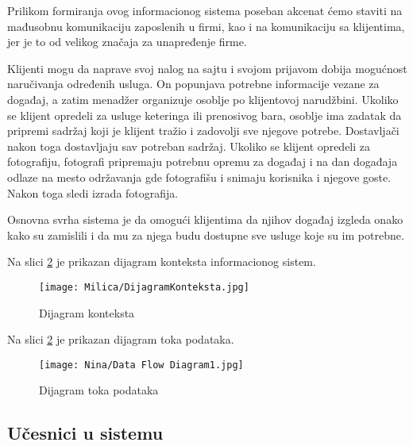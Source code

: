 \documentclass[a4paper]{article}
\begin{document}
Prilikom formiranja ovog informacionog sistema poseban akcenat ćemo staviti na mađusobnu komunikaciju zaposlenih u firmi, kao i na komunikaciju sa klijentima, jer je to od velikog značaja za unapređenje firme.
    
Klijenti mogu da naprave svoj nalog na sajtu i svojom prijavom dobija mogućnost naručivanja određenih usluga. On popunjava potrebne informacije vezane za događaj, a zatim menadžer organizuje osoblje po klijentovoj narudžbini. Ukoliko se klijent opredeli za usluge keteringa ili prenosivog bara, osoblje ima zadatak da pripremi sadržaj koji je klijent tražio i zadovolji sve njegove potrebe. Dostavljači nakon toga dostavljaju sav potreban sadržaj.
Ukoliko se klijent opredeli za fotografiju, fotografi pripremaju potrebnu opremu za događaj i na dan događaja odlaze na mesto održavanja gde fotografišu i snimaju korisnika i njegove goste. Nakon toga sledi izrada fotografija. 
    
Osnovna svrha sistema je da omogući klijentima da njihov događaj izgleda onako kako su zamislili i da mu za njega budu dostupne sve usluge koje su im potrebne. 

\newpage
Na slici \ref{fig:Tok} je prikazan dijagram konteksta informacionog sistem.
    
    \begin{figure}[H]
    \centering
    \texttt{[image: Milica/DijagramKonteksta.jpg]}
    
    \caption{Dijagram konteksta}
    \label{fig:Tok}
\end{figure}

\newpage
Na slici \ref{fig:Tok} je prikazan dijagram toka podataka.
    
    \begin{figure}[H]
    \centering
    \texttt{[image: Nina/Data Flow Diagram1.jpg]}
    \caption{Dijagram toka podataka}
    \label{fig:Tok}
\end{figure}
    
    \subsection{Učesnici u sistemu}
    
\end{document}
